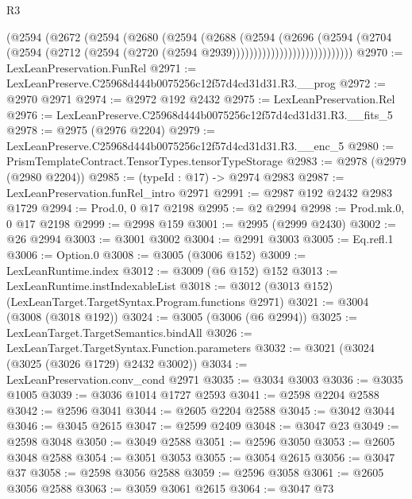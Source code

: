 \begin{lexlean}{R3}
\begin{coremodule}
                              (@2594
                                (@2672
                                  (@2594
                                    (@2680
                                      (@2594
                                        (@2688
                                          (@2594
                                            (@2696
                                              (@2594
                                                (@2704
                                                  (@2594
                                                    (@2712
                                                      (@2594
                                                        (@2720
                                                          (@2594 @2939))))))))))))))))))))))))))))
@2970 := LexLeanPreservation.FunRel
@2971 := LexLeanPreserve.C25968d444b0075256c12f57d4cd31d31.R3.__prog
@2972 := @2970 @2971
@2974 := @2972 @192 @2432
@2975 := LexLeanPreservation.Rel
@2976 := LexLeanPreserve.C25968d444b0075256c12f57d4cd31d31.R3.__fits_5
@2978 := @2975 (@2976 @2204)
@2979 := LexLeanPreserve.C25968d444b0075256c12f57d4cd31d31.R3.__enc_5
@2980 := PrismTemplateContract.TensorTypes.tensorTypeStorage
@2983 := @2978 (@2979 (@2980 @2204))
@2985 := (typeId : @17) -> @2974 @2983
@2987 := LexLeanPreservation.funRel_intro @2971
@2991 := @2987 @192 @2432 @2983 @1729
@2994 := Prod.{0, 0} @17 @2198
@2995 := @2 @2994
@2998 := Prod.mk.{0, 0} @17 @2198
@2999 := @2998 @159
@3001 := @2995 (@2999 @2430)
@3002 := @26 @2994
@3003 := @3001 @3002
@3004 := @2991 @3003
@3005 := Eq.refl.{1}
@3006 := Option.{0}
@3008 := @3005 (@3006 @152)
@3009 := LexLeanRuntime.index
@3012 := @3009 (@6 @152) @152
@3013 := LexLeanRuntime.instIndexableList
@3018 := @3012 (@3013 @152) (LexLeanTarget.TargetSyntax.Program.functions @2971)
@3021 := @3004 (@3008 (@3018 @192))
@3024 := @3005 (@3006 (@6 @2994))
@3025 := LexLeanTarget.TargetSemantics.bindAll
@3026 := LexLeanTarget.TargetSyntax.Function.parameters
@3032 := @3021 (@3024 (@3025 (@3026 @1729) @2432 @3002))
@3034 := LexLeanPreservation.conv_cond @2971
@3035 := @3034 @3003
@3036 := @3035 @1005
@3039 := @3036 @1014 @1727 @2593
@3041 := @2598 @2204 @2588
@3042 := @2596 @3041
@3044 := @2605 @2204 @2588
@3045 := @3042 @3044
@3046 := @3045 @2615
@3047 := @2599 @2409
@3048 := @3047 @23
@3049 := @2598 @3048
@3050 := @3049 @2588
@3051 := @2596 @3050
@3053 := @2605 @3048 @2588
@3054 := @3051 @3053
@3055 := @3054 @2615
@3056 := @3047 @37
@3058 := @2598 @3056 @2588
@3059 := @2596 @3058
@3061 := @2605 @3056 @2588
@3063 := @3059 @3061 @2615
@3064 := @3047 @73

\end{coremodule}
\end{lexlean}
